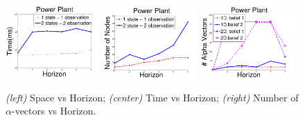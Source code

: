 \documentclass{article} %
\begin{document}
\begin{figure}[tbp!]
\vspace{2mm}
\centering
\includegraphics[width=0.32\textwidth]{pics/time2.pdf}
\includegraphics[width=0.32\textwidth]{pics/nodes2.pdf}
\includegraphics[width=0.32\textwidth]{pics/alpha-vectors2.pdf}
\vspace{-1mm}
\caption{\footnotesize 
{\it (left)} Space vs Horizon; 
{\it (center)} Time vs Horizon; 
{\it (right)} Number of $\alpha$-vectors vs Horizon.
}
\label{fig:timeSpace}
\end{figure}
\end{document}
